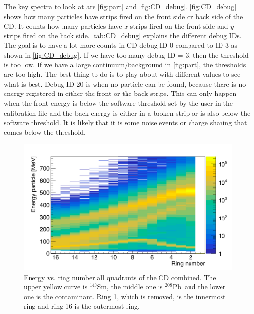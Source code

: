 \documentclass[twoside,english]{uiofysmaster/uiofysmaster}
\newcommand{\Sm}{$^{140}$Sm} %
\newcommand{\Pb}{$^{208}$Pb}
\let\orgautoref\autoref
\renewcommand{\autoref}
        {%
		 \def\subsectionautorefname{Section}%
		 \def\subsubsectionautorefname{Section}%
          \orgautoref}
\begin{document}
The key spectra to look at are \autoref{fig:part} and \autoref{fig:CD_debug}. 
\autoref{fig:CD_debug} shows how many particles have strips fired on the front side or back side of the CD. 
It counts how many particles have $x$ strips fired on the front side and $y$ strips fired on the back side. 
\autoref{tab:CD_debug} explains the different debug IDs. 
The goal is to have a lot more counts in CD debug ID 0 compared to ID 3 as shown in \autoref{fig:CD_debug}. 
If we have too many debug ID = 3, then the threshold is too low. If we have a large continuum/background in \autoref{fig:part}, the thresholds are too high. The best thing to do is to play about with different values to see what is best.
Debug ID 20 is when no particle can be found, because there is no energy registered in either the front or the back strips. 
This can only happen when the front energy is below the software threshold set by the user in the calibration file and the back energy is either in a broken strip or is also below the software threshold. 
It is likely that it is some noise events or charge sharing that comes below the threshold. 


\begin{figure}[ht]
	\centering
	\includegraphics[width=\textwidth]{../Plots/plotting/E_vs_ring_all.png}
	\caption{Energy vs. ring number all quadrants of the CD combined. The upper yellow curve is \Sm, the middle one is \Pb\ and the lower one is the contaminant. Ring 1, which is removed, is the innermost ring and ring 16 is the outermost ring.}
	\label{fig:part}
\end{figure}
\end{document}
